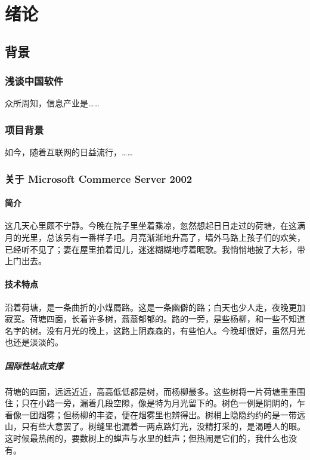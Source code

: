 \documentclass[printMode]{ecnuthesis}
\begin{document}
\mainmatter

\chapter{绪论}

\section{背景}

\subsection{浅谈中国软件}

众所周知，信息产业是……

\subsection{项目背景}

如今，随着互联网的日益流行，……

\subsection{关于 Microsoft Commerce Server 2002}

\subsubsection{简介}

这几天心里颇不宁静。今晚在院子里坐着乘凉，忽然想起日日走过的荷塘，在这满月的光里，总该另有一番样子吧。月亮渐渐地升高了，墙外马路上孩子们的欢笑，已经听不见了；妻在屋里拍着闰儿，迷迷糊糊地哼着眠歌。我悄悄地披了大衫，带上门出去。

\subsubsection{技术特点}

沿着荷塘，是一条曲折的小煤屑路。这是一条幽僻的路；白天也少人走，夜晚更加寂寞。荷塘四面，长着许多树，蓊蓊郁郁的。路的一旁，是些杨柳，和一些不知道名字的树。没有月光的晚上，这路上阴森森的，有些怕人。今晚却很好，虽然月光也还是淡淡的。

\paragraph{国际性站点支撑}

荷塘的四面，远远近近，高高低低都是树，而杨柳最多。这些树将一片荷塘重重围住；只在小路一旁，漏着几段空隙，像是特为月光留下的。树色一例是阴阴的，乍看像一团烟雾；但杨柳的丰姿，便在烟雾里也辨得出。树梢上隐隐约约的是一带远山，只有些大意罢了。树缝里也漏着一两点路灯光，没精打采的，是渴睡人的眼。这时候最热闹的，要数树上的蝉声与水里的蛙声；但热闹是它们的，我什么也没有。
\end{document}

